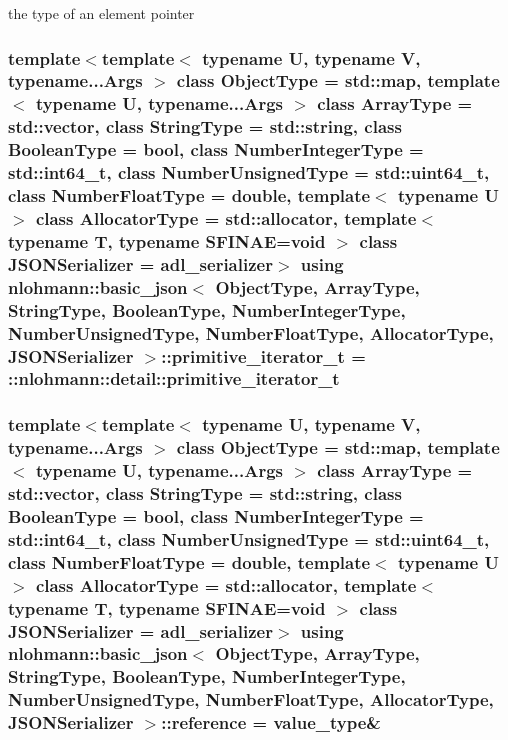 the type of an element pointer 

\subsubsection[{\texorpdfstring{primitive\+\_\+iterator\+\_\+t}{primitive_iterator_t}}]{\setlength{\rightskip}{0pt plus 5cm}template$<$template$<$ typename U, typename V, typename...\+Args $>$ class Object\+Type = std\+::map, template$<$ typename U, typename...\+Args $>$ class Array\+Type = std\+::vector, class String\+Type  = std\+::string, class Boolean\+Type  = bool, class Number\+Integer\+Type  = std\+::int64\+\_\+t, class Number\+Unsigned\+Type  = std\+::uint64\+\_\+t, class Number\+Float\+Type  = double, template$<$ typename U $>$ class Allocator\+Type = std\+::allocator, template$<$ typename T, typename S\+F\+I\+N\+A\+E=void $>$ class J\+S\+O\+N\+Serializer = adl\+\_\+serializer$>$ using {\bf nlohmann\+::basic\+\_\+json}$<$ Object\+Type, Array\+Type, String\+Type, Boolean\+Type, Number\+Integer\+Type, Number\+Unsigned\+Type, Number\+Float\+Type, Allocator\+Type, J\+S\+O\+N\+Serializer $>$\+::{\bf primitive\+\_\+iterator\+\_\+t} =  \+::{\bf nlohmann\+::detail\+::primitive\+\_\+iterator\+\_\+t}\hspace{0.3cm}{\ttfamily [private]}}\hypertarget{classnlohmann_1_1basic__json_a2b38de408edf89649e8bd3abcfdff038}{}\label{classnlohmann_1_1basic__json_a2b38de408edf89649e8bd3abcfdff038}
\subsubsection[{\texorpdfstring{reference}{reference}}]{\setlength{\rightskip}{0pt plus 5cm}template$<$template$<$ typename U, typename V, typename...\+Args $>$ class Object\+Type = std\+::map, template$<$ typename U, typename...\+Args $>$ class Array\+Type = std\+::vector, class String\+Type  = std\+::string, class Boolean\+Type  = bool, class Number\+Integer\+Type  = std\+::int64\+\_\+t, class Number\+Unsigned\+Type  = std\+::uint64\+\_\+t, class Number\+Float\+Type  = double, template$<$ typename U $>$ class Allocator\+Type = std\+::allocator, template$<$ typename T, typename S\+F\+I\+N\+A\+E=void $>$ class J\+S\+O\+N\+Serializer = adl\+\_\+serializer$>$ using {\bf nlohmann\+::basic\+\_\+json}$<$ Object\+Type, Array\+Type, String\+Type, Boolean\+Type, Number\+Integer\+Type, Number\+Unsigned\+Type, Number\+Float\+Type, Allocator\+Type, J\+S\+O\+N\+Serializer $>$\+::{\bf reference} =  {\bf value\+\_\+type}\&}\hypertarget{classnlohmann_1_1basic__json_ac6a5eddd156c776ac75ff54cfe54a5bc}{}\label{classnlohmann_1_1basic__json_ac6a5eddd156c776ac75ff54cfe54a5bc}



